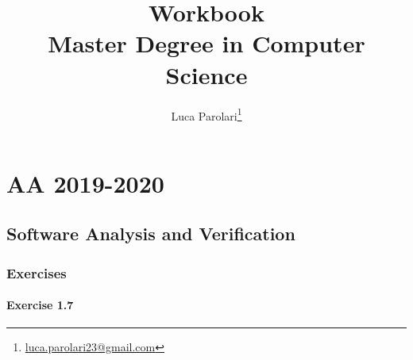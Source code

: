 \documentclass[12pt,a4paper,oneside]{book}
\title{Workbook \\ Master Degree in Computer Science}
\author{Luca Parolari\footnote{\href{mailto:luca.parolari23@gmail.com}{luca.parolari23@gmail.com}}}
\begin{document}
\maketitle
\tableofcontents

\part{AA 2019-2020}

\chapter{Software Analysis and Verification}

\section{Exercises}

\subsection{Exercise 1.7}
\end{document}
